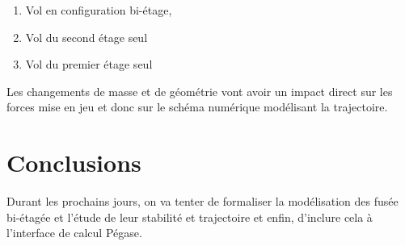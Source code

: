 \documentclass[a4paper]{article}
\begin{document}
\begin{enumerate}

\item[] Vol en configuration bi-étage,
\item[] Vol du second étage seul
\item[] Vol du premier étage seul

\end{enumerate}

Les changements de masse et de géométrie vont avoir un impact direct sur les forces mise en jeu et donc sur le schéma numérique modélisant la trajectoire.






\section{Conclusions}

Durant les prochains jours, on va tenter de formaliser la modélisation des fusée bi-étagée et l'étude de leur stabilité et trajectoire et enfin, d'inclure cela à l'interface de calcul Pégase.


%
%
\end{document}
